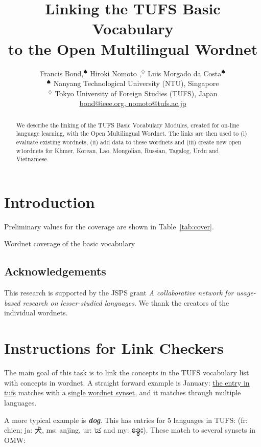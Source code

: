 \documentclass[11pt]{article}
\title{Linking the TUFS Basic Vocabulary \\ to the Open Multilingual Wordnet}
\author{
	Francis Bond,$^\spadesuit$ 
	Hiroki Nomoto ,$^\diamondsuit$
	Luis Morgado da Costa$^\spadesuit$\\
  $^\spadesuit$ Nanyang Technological University (NTU),  Singapore\\
  $^\diamondsuit$
  Tokyo University of Foreign Studies (TUFS), Japan \\
  \url{bond@ieee.org, nomoto@tufs.ac.jp} }
\date{}
\newcommand{\myanmar}[1]{{\myanmarfont #1}}
\newcommand{\lex}[1]{\textbf{\textit{#1}}}
\begin{document}
\maketitle
\begin{abstract}
We describe the linking of the TUFS Basic Vocabulary Modules, created for
on-line language learning, with the Open Multilingual Wordnet.  The
links are then used to (i) evaluate existing wordnets, (ii) add data
to these wordnets and (iii) create new open w1ordnets for Khmer,
Korean, Lao, Mongolian, Russian, Tagalog, Urdu and Vietnamese.


\end{abstract}
\section{Introduction}

Preliminary values for the coverage are shown in Table~\ref{tab:cover}.

\begin{table}
  \centering
  
  \caption{Wordnet coverage of the basic vocabulary}\label{tab:cover}
\end{table}


\subsection*{Acknowledgements}

This research is supported by the JSPS grant \textit{A collaborative
  network for usage-based research on lesser-studied languages}.  We
thank the creators of the individual wordnets.




\clearpage
\onecolumn
\appendix
\section{Instructions for Link Checkers}

The main goal of this task is to link the concepts in the TUFS
vocabulary list with concepts in wordnet.  A straight forward example
is January: \href{14674}{the entry in tufs} matches with a
\href{http://compling.hss.ntu.edu.sg/omw/cgi-bin/wn-gridx.cgi?usrname=&gridmode=grid&synset=15210045-n&lang=eng&lang2=eng}{single
  wordnet synset}, and it matches through multiple languages.

A more typical example is \lex{dog}.  This has entries for 5 languages
in TUFS: (fr: chien; ja: 犬, ms: anjing, ur: \texturdu{کتا} and my: \myanmar{ခွေး}).  
These match to several synsets in OMW: 
\end{document}
